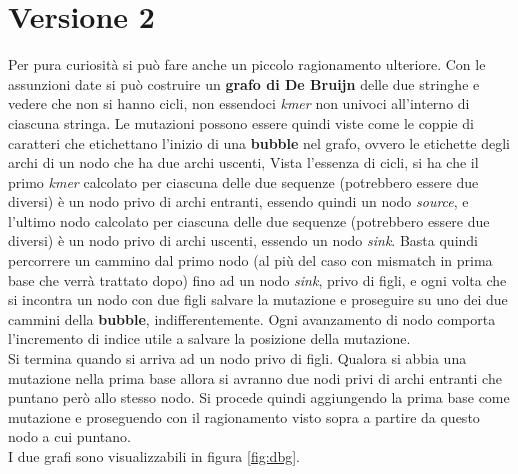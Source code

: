 \documentclass[a4paper,12pt, oneside]{book}
\begin{document}
\section{Versione 2}
Per pura curiosità si può fare anche un piccolo ragionamento ulteriore. Con le
assunzioni date si può costruire un \textbf{grafo di De Bruijn} delle due
stringhe e vedere che non si hanno cicli, non essendoci \textit{kmer} non
univoci all'interno di ciascuna stringa. Le mutazioni possono essere quindi
viste come le coppie di caratteri 
che etichettano l'inizio di una \textbf{bubble} nel grafo, ovvero le etichette
degli archi di un nodo che ha due archi uscenti, Vista l'essenza di
cicli, si ha che il primo \textit{kmer} calcolato per ciascuna delle due
sequenze (potrebbero essere due diversi) è un nodo privo di archi entranti,
essendo quindi un nodo \textit{source}, e
l'ultimo nodo calcolato per ciascuna delle due
sequenze (potrebbero essere due diversi) è un nodo privo di archi uscenti,
essendo un nodo \textit{sink}. Basta quindi percorrere un cammino dal primo nodo
(al più del caso con mismatch in prima base che verrà trattato dopo) fino ad un
nodo \textit{sink}, privo di figli, e ogni volta che si incontra un nodo con due
figli salvare la mutazione e proseguire su uno dei due cammini della
\textbf{bubble}, indifferentemente. Ogni avanzamento di nodo comporta
l'incremento di indice utile a salvare la posizione della mutazione.\\
Si termina quando si arriva ad un nodo privo di figli.
Qualora si abbia una mutazione nella prima base allora si avranno due
nodi privi di archi entranti che puntano però allo stesso nodo. Si procede
quindi aggiungendo la prima base come mutazione e proseguendo con il
ragionamento visto sopra a partire da questo nodo a cui puntano.\\
I due grafi sono visualizzabili in figura \ref{fig:dbg}.\\
\end{document}
